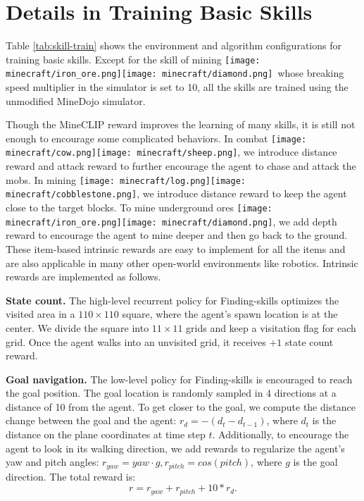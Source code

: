 \documentclass{article}
\newcommand{\mccobblestone}{\texttt{[image: minecraft/cobblestone.png]}}
\newcommand{\mccow}{\texttt{[image: minecraft/cow.png]}}
\newcommand{\mclog}{\texttt{[image: minecraft/log.png]}}
\newcommand{\mcsheep}{\texttt{[image: minecraft/sheep.png]}}
\newcommand{\mcironore}{\texttt{[image: minecraft/iron\_ore.png]}}
\newcommand{\mcdiamond}{\texttt{[image: minecraft/diamond.png]}}
\begin{document}
\newpage


\section{Details in Training Basic Skills}
\label{appendix:skill-details}

Table \ref{tab:skill-train} shows the environment and algorithm configurations for training basic skills. Except for the skill of mining \mcironore\mcdiamond \  whose breaking speed multiplier in the simulator is set to 10, all the skills are trained using the unmodified MineDojo simulator. 

Though the MineCLIP reward improves the learning of many skills, it is still not enough to encourage some complicated behaviors. In combat \mccow \mcsheep, we introduce distance reward and attack reward to further encourage the agent to chase and attack the mobs. In mining \mclog \mccobblestone, we introduce distance reward to keep the agent close to the target blocks. To mine underground ores \mcironore \mcdiamond, we add depth reward to encourage the agent to mine deeper and then go back to the ground. These item-based intrinsic rewards are easy to implement for all the items and are also applicable in many other open-world environments like robotics.
Intrinsic rewards are implemented as follows.

\textbf{State count.} The high-level recurrent policy for Finding-skills optimizes the visited area in a $110\times 110$ square, where the agent's spawn location is at the center. We divide the square into $11\times 11$ grids and keep a visitation flag for each grid. Once the agent walks into an unvisited grid, it receives $+1$ state count reward.

\textbf{Goal navigation.} The low-level policy for Finding-skills is encouraged to reach the goal position. The goal location is randomly sampled in 4 directions at a distance of 10 from the agent. To get closer to the goal, we compute the distance change between the goal and the agent: $r_d = -(d_t-d_{t-1})$, where $d_t$ is the distance on the plane coordinates at time step $t$. Additionally, to encourage the agent to look in its walking direction, we add rewards to regularize the agent's yaw and pitch angles: $r_{yaw}=yaw\cdot g, r_{pitch}=cos(pitch)$, where $g$ is the goal direction. The total reward is: 
\begin{equation}
    r=r_{yaw}+r_{pitch}+10 * r_d.
\end{equation}
\end{document}
